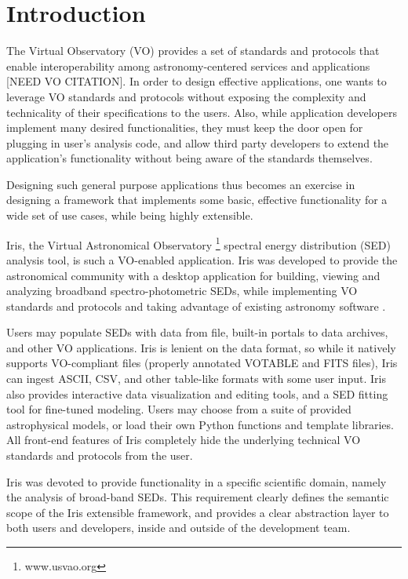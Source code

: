 \label{sec:introduction}
\section{Introduction} 
The Virtual Observatory (VO) provides a set of standards and protocols that enable interoperability among astronomy-centered services and applications [NEED VO CITATION].
In order to design effective applications, one wants to leverage VO standards and protocols without exposing the complexity and technicality of their specifications to the users. Also, while application developers implement many desired functionalities, they must keep the door open for plugging in user's analysis code, and allow third party developers to extend the application's functionality without being aware of the standards themselves.

Designing such general purpose applications thus becomes an exercise in designing a framework that implements some basic, effective functionality for a wide set of use cases, while being highly extensible.

Iris, the Virtual Astronomical Observatory \footnote{www.usvao.org} spectral energy distribution (SED) analysis tool, is such a VO-enabled application. Iris was developed to provide the astronomical community with a desktop application for building, viewing and analyzing broadband spectro-photometric SEDs, while implementing VO standards and protocols and taking advantage of existing astronomy software \cite{2012ASPC..461..893D,2013AAS...22124038L}.

Users may populate SEDs with data from file, built-in portals to data archives, and other VO applications. Iris is lenient on the data format, so while it natively supports VO-compliant files (properly annotated VOTABLE and FITS files), Iris can ingest ASCII, CSV, and other table-like formats with some user input. Iris also provides interactive data visualization and editing tools, and a SED fitting tool for fine-tuned modeling. Users may choose from a suite of provided astrophysical models, or load their own Python functions and template libraries. All front-end features of Iris completely hide the underlying technical VO standards and protocols from the user.

Iris was devoted to provide functionality in a specific scientific domain, namely the analysis of broad-band SEDs. This requirement clearly defines the semantic scope of the  Iris extensible framework, and provides a clear abstraction layer to both users and developers, inside and outside of the development team.

